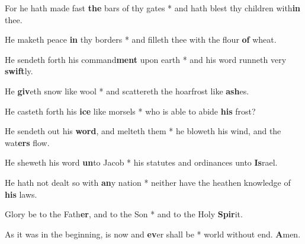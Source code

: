 \begin{multicols}{2}
	For he hath made fast \textbf{the} bars of thy gates * and hath blest thy children with\textbf{in} thee.
	
	He maketh peace \textbf{in} thy borders * and filleth thee with the flour \textbf{of} wheat.
	
	He sendeth forth his command\textbf{ment} upon earth * and his word runneth very \textbf{swift}ly.
	
	He \textbf{giv}eth snow like wool * and scattereth the hoarfrost like \textbf{ash}es.
	
	He casteth forth his \textbf{ice} like morsels * who is able to abide \textbf{his} frost?
	
	He sendeth out his \textbf{word}, and melteth them * he bloweth his wind, and the wat\textbf{ers} flow.
	
	He sheweth his word \textbf{un}to Jacob * his statutes and ordinances unto \textbf{Is}rael.
	
	He hath not dealt so with \textbf{an}y nation * neither have the heathen knowledge of \textbf{his} laws.
	
	Glory be to the Fath\textbf{er}, and to the Son * and to the Holy \textbf{Spir}it.
	
	As it was in the beginning, is now and \textbf{ev}er shall be * world without end. \textbf{A}men.
\end{multicols}